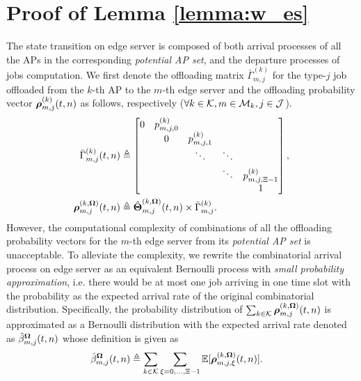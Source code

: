 \section{ Proof of Lemma \ref{lemma:w_es} }
\label{append_2}
The state transition on edge server is composed of both arrival processes of all the APs in the corresponding \emph{potential AP set}, and the departure processes of jobs computation.
We first denote the offloading matrix $\bar{\Gamma}^{(k)}_{m,j}$ for the type-$j$ job offloaded from the $k$-th AP to the $m$-th edge server and the offloading probability vector $\boldsymbol{\rho}^{(k)}_{m,j}({t,n})$ as follows, respectively ($\forall k\in\mathcal{K}, m\in\mathcal{M}_{k}, j\in\mathcal{J}$).
\begin{align}
    \bar{\Gamma}^{(k)}_{m,j}(t,n) &\triangleq
    \begin{bmatrix}
        0 & p^{(k)}_{m,j,0} &                 &        &                     \\
        & 0                 & p^{(k)}_{m,j,1} &        &                     \\
        &                   & \ddots          & \ddots &                     \\
        &                   &                 & \ddots & p^{(k)}_{m,j,\Xi-1} \\
        &                   &                 &        & 1                   \\
    \end{bmatrix},
    \\
    \boldsymbol{\rho}^{(k, \boldsymbol{\Omega})}_{m,j}({t,n}) &\triangleq \hat{\boldsymbol{\Theta}}^{(k, \boldsymbol{\Omega})}_{m,j}({t,n}) \times \bar{\Gamma}^{(k)}_{m,j}.
\end{align}
However, the computational complexity of combinations of all the offloading probability vectors for the $m$-th edge server from its \emph{potential AP set} is unacceptable.
To alleviate the complexity, we rewrite the combinatorial arrival process on edge server as an equivalent Bernoulli process with \emph{small probability approximation}, i.e. there would be at most one job arriving in one time slot with the probability as the expected arrival rate of the original combinatorial distribution.
Specifically, the probability distribution of $\sum_{k\in\mathcal{K}} \boldsymbol{\rho}^{(k, \boldsymbol{\Omega})}_{m,j}({t,n})$ is approximated as a Bernoulli distribution with the expected arrival rate denoted as $\hat{\beta}^{\boldsymbol{\Omega}}_{m,j}({t,n})$ whose definition is given as
\begin{align}
    \hat{\beta}^{\boldsymbol{\Omega}}_{m,j}({t,n}) &\triangleq \sum_{k\in\mathcal{K}} \sum_{\xi=0,\dots,\Xi-1} \mathbb{E}[\boldsymbol{\rho}^{(k, \boldsymbol{\Omega})}_{m,j,\xi}({t,n})].
    \label{eqn_0}
\end{align}


